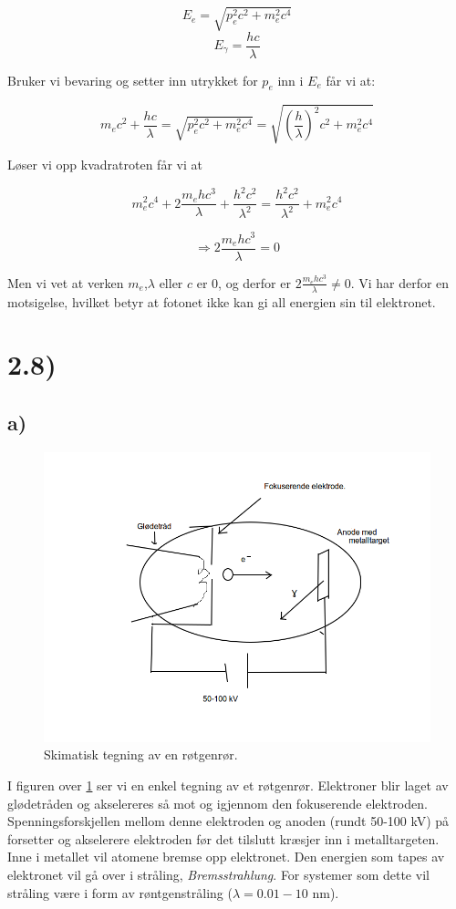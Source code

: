 \documentclass[a4paper,norsk, 10pt]{article}
\begin{document}
$$
E_e = \sqrt{p_e^2c^2 + m_e^2c^4}
$$
$$
E_{\gamma} = \frac{hc}{\lambda}
$$

Bruker vi bevaring og setter inn utrykket for $p_e$ inn i $E_e$ får vi at:

$$
m_ec^2 + \frac{hc}{\lambda} = \sqrt{p_e^2c^2 + m_e^2c^4} = \sqrt{(\frac{h}{\lambda})^2c^2 + m_e^2c^4}
$$

Løser vi opp kvadratroten får vi at

$$
m_e^2c^4 +2\frac{m_ehc^3}{\lambda} + \frac{h^2c^2}{\lambda^2} = \frac{h^2c^2}{\lambda^2} + m_e^2c^4
$$

$$
\Rightarrow 2\frac{m_ehc^3}{\lambda} = 0
$$

Men vi vet at verken $m_e$,$\lambda$ eller $c$ er $0$, og derfor er $2\frac{m_ehc^3}{\lambda} \ne 0$. Vi har derfor en motsigelse, hvilket betyr at fotonet ikke kan gi all energien sin til elektronet.

\section*{2.8)}

\subsection*{a)}

\begin{figure}[H]
\centering
\includegraphics[scale=.4]{rontgen.png}
\caption{Skimatisk tegning av en røtgenrør.}\label{img::rontgenror}
\end{figure}

I figuren over \ref{img::rontgenror} ser vi en enkel tegning av et røtgenrør. Elektroner blir laget av glødetråden og akselereres så mot og igjennom den fokuserende elektroden. Spenningsforskjellen mellom denne elektroden og anoden (rundt 50-100 kV) på forsetter og akselerere elektroden før det tilslutt kræsjer inn i metalltargeten. Inne i metallet vil atomene bremse opp elektronet. Den energien som tapes av elektronet vil gå over i stråling, \textit{Bremsstrahlung}. For systemer som dette vil stråling være i form av røntgenstråling ($\lambda = 0.01 - 10$ nm).
\end{document}
